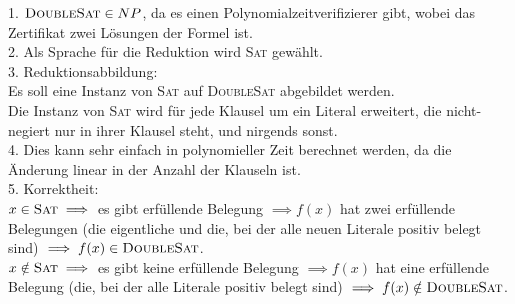 1. $\textsc{DoubleSat} \in NP$, da es einen Polynomialzeitverifizierer gibt, wobei das Zertifikat zwei Lösungen der Formel ist.\\
2. Als Sprache für die Reduktion wird \textsc{Sat} gewählt.\\
3. Reduktionsabbildung:\\
Es soll eine Instanz von \textsc{Sat} auf \textsc{DoubleSat} abgebildet werden.\\
Die Instanz von \textsc{Sat} wird für jede Klausel um ein Literal erweitert, die nicht-negiert nur in ihrer Klausel steht, und nirgends sonst.\\
4. Dies kann sehr einfach in polynomieller Zeit berechnet werden, da die Änderung linear in der Anzahl der Klauseln ist.\\
5. Korrektheit:\\
$x \in \textsc{Sat} \implies$ es gibt erfüllende Belegung $\implies f(x)$ hat zwei erfüllende Belegungen (die eigentliche und die, bei der alle neuen Literale positiv belegt sind) $\implies f(x) \in \textsc{DoubleSat}$.\\
$x \notin \textsc{Sat} \implies$ es gibt keine erfüllende Belegung $\implies f(x)$ hat eine erfüllende Belegung (die, bei der alle Literale positiv belegt sind) $\implies f(x) \notin \textsc{DoubleSat}$.